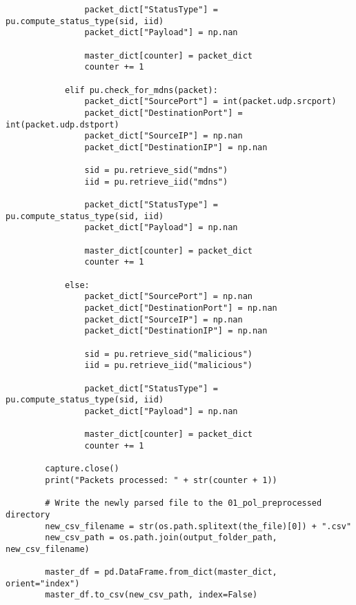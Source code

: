 \begin{verbatim}
                packet_dict["StatusType"] = pu.compute_status_type(sid, iid)
                packet_dict["Payload"] = np.nan

                master_dict[counter] = packet_dict
                counter += 1

            elif pu.check_for_mdns(packet):
                packet_dict["SourcePort"] = int(packet.udp.srcport)
                packet_dict["DestinationPort"] = int(packet.udp.dstport)
                packet_dict["SourceIP"] = np.nan
                packet_dict["DestinationIP"] = np.nan

                sid = pu.retrieve_sid("mdns")
                iid = pu.retrieve_iid("mdns")

                packet_dict["StatusType"] = pu.compute_status_type(sid, iid)
                packet_dict["Payload"] = np.nan

                master_dict[counter] = packet_dict
                counter += 1

            else:
                packet_dict["SourcePort"] = np.nan
                packet_dict["DestinationPort"] = np.nan
                packet_dict["SourceIP"] = np.nan
                packet_dict["DestinationIP"] = np.nan

                sid = pu.retrieve_sid("malicious")
                iid = pu.retrieve_iid("malicious")

                packet_dict["StatusType"] = pu.compute_status_type(sid, iid)
                packet_dict["Payload"] = np.nan

                master_dict[counter] = packet_dict
                counter += 1

        capture.close()
        print("Packets processed: " + str(counter + 1))

        # Write the newly parsed file to the 01_pol_preprocessed directory
        new_csv_filename = str(os.path.splitext(the_file)[0]) + ".csv"
        new_csv_path = os.path.join(output_folder_path, new_csv_filename)

        master_df = pd.DataFrame.from_dict(master_dict, orient="index")
        master_df.to_csv(new_csv_path, index=False)
\end{verbatim}
